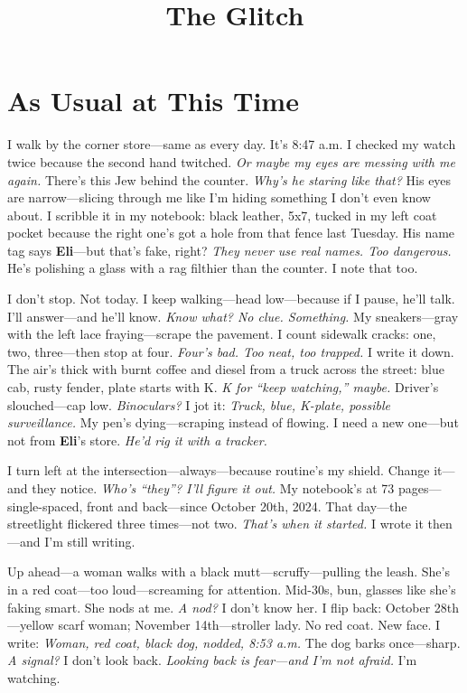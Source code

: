 \documentclass{article}
\title{The Glitch}
\author{}
\date{}
\begin{document}
\maketitle

\section*{As Usual at This Time}

I walk by the corner store—same as every day. It’s 8:47 a.m. I checked my watch twice because the second hand twitched. \textit{Or maybe my eyes are messing with me again.} There’s this Jew behind the counter. \textit{Why’s he staring like that?} His eyes are narrow—slicing through me like I’m hiding something I don’t even know about. I scribble it in my notebook: black leather, 5x7, tucked in my left coat pocket because the right one’s got a hole from that fence last Tuesday. His name tag says \textbf{Eli}—but that’s fake, right? \textit{They never use real names. Too dangerous.} He’s polishing a glass with a rag filthier than the counter. I note that too.

I don’t stop. Not today. I keep walking—head low—because if I pause, he’ll talk. I’ll answer—and he’ll know. \textit{Know what? No clue. Something.} My sneakers—gray with the left lace fraying—scrape the pavement. I count sidewalk cracks: one, two, three—then stop at four. \textit{Four’s bad. Too neat, too trapped.} I write it down. The air’s thick with burnt coffee and diesel from a truck across the street: blue cab, rusty fender, plate starts with K. \textit{K for “keep watching,” maybe.} Driver’s slouched—cap low. \textit{Binoculars?} I jot it: \textit{Truck, blue, K-plate, possible surveillance.} My pen’s dying—scraping instead of flowing. I need a new one—but not from \textbf{Eli}’s store. \textit{He’d rig it with a tracker.}

I turn left at the intersection—always—because routine’s my shield. Change it—and they notice. \textit{Who’s “they”? I’ll figure it out.} My notebook’s at 73 pages—single-spaced, front and back—since October 20th, 2024. That day—the streetlight flickered three times—not two. \textit{That’s when it started.} I wrote it then—and I’m still writing.

Up ahead—a woman walks with a black mutt—scruffy—pulling the leash. She’s in a red coat—too loud—screaming for attention. Mid-30s, bun, glasses like she’s faking smart. She nods at me. \textit{A nod?} I don’t know her. I flip back: October 28th—yellow scarf woman; November 14th—stroller lady. No red coat. New face. I write: \textit{Woman, red coat, black dog, nodded, 8:53 a.m.} The dog barks once—sharp. \textit{A signal?} I don’t look back. \textit{Looking back is fear—and I’m not afraid.} I’m watching.
\end{document}
